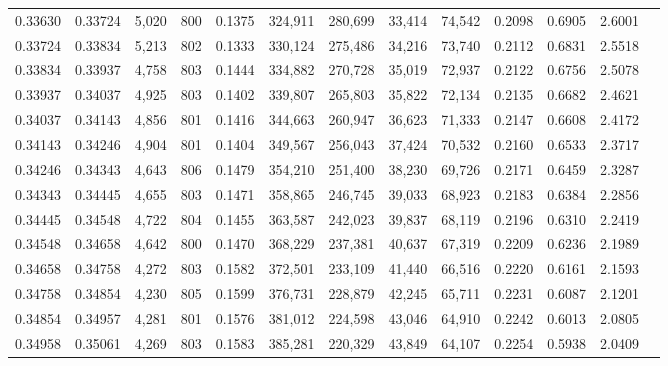 \begin{tabular}{rrrrrrrrrrrrr}
0.33630 & 0.33724 &  5,020 & 800 &                                     0.1375 & 324,911 & 280,699 &  33,414 &  74,542 & 0.2098 & 0.6905 & 2.6001 \\
0.33724 & 0.33834 &  5,213 & 802 &                                     0.1333 & 330,124 & 275,486 &  34,216 &  73,740 & 0.2112 & 0.6831 & 2.5518 \\
0.33834 & 0.33937 &  4,758 & 803 &                                     0.1444 & 334,882 & 270,728 &  35,019 &  72,937 & 0.2122 & 0.6756 & 2.5078 \\
0.33937 & 0.34037 &  4,925 & 803 &                                     0.1402 & 339,807 & 265,803 &  35,822 &  72,134 & 0.2135 & 0.6682 & 2.4621 \\
0.34037 & 0.34143 &  4,856 & 801 &                                     0.1416 & 344,663 & 260,947 &  36,623 &  71,333 & 0.2147 & 0.6608 & 2.4172 \\
0.34143 & 0.34246 &  4,904 & 801 &                                     0.1404 & 349,567 & 256,043 &  37,424 &  70,532 & 0.2160 & 0.6533 & 2.3717 \\
0.34246 & 0.34343 &  4,643 & 806 &                                     0.1479 & 354,210 & 251,400 &  38,230 &  69,726 & 0.2171 & 0.6459 & 2.3287 \\
0.34343 & 0.34445 &  4,655 & 803 &                                     0.1471 & 358,865 & 246,745 &  39,033 &  68,923 & 0.2183 & 0.6384 & 2.2856 \\
0.34445 & 0.34548 &  4,722 & 804 &                                     0.1455 & 363,587 & 242,023 &  39,837 &  68,119 & 0.2196 & 0.6310 & 2.2419 \\
0.34548 & 0.34658 &  4,642 & 800 &                                     0.1470 & 368,229 & 237,381 &  40,637 &  67,319 & 0.2209 & 0.6236 & 2.1989 \\
0.34658 & 0.34758 &  4,272 & 803 &                                     0.1582 & 372,501 & 233,109 &  41,440 &  66,516 & 0.2220 & 0.6161 & 2.1593 \\
0.34758 & 0.34854 &  4,230 & 805 &                                     0.1599 & 376,731 & 228,879 &  42,245 &  65,711 & 0.2231 & 0.6087 & 2.1201 \\
0.34854 & 0.34957 &  4,281 & 801 &                                     0.1576 & 381,012 & 224,598 &  43,046 &  64,910 & 0.2242 & 0.6013 & 2.0805 \\
0.34958 & 0.35061 &  4,269 & 803 &                                     0.1583 & 385,281 & 220,329 &  43,849 &  64,107 & 0.2254 & 0.5938 & 2.0409 \\

\end{tabular}
